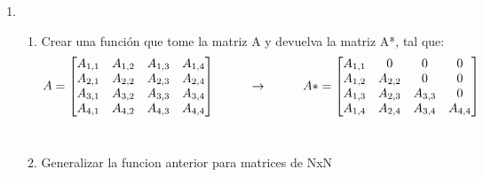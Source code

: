 \documentclass[a4paper, 11pt]{article}
\begin{document}
\begin{enumerate}[font=\large\bfseries]
\item
\begin{enumerate}
    \item Crear una función que tome la matriz A y devuelva la matriz A*, tal que:
    \[
      A=\begin{bmatrix}
        A_{1,1} & A_{1,2} & A_{1,3} & A_{1,4} \\
        A_{2,1} & A_{2,2} & A_{2,3} & A_{2,4} \\
        A_{3,1} & A_{3,2} & A_{3,3} & A_{3,4} \\
        A_{4,1} & A_{4,2} & A_{4,3} & A_{4,4}
     \end{bmatrix}
    \hspace{1cm} \LARGE\rightarrow\normalsize
    \hspace{1cm} A*=\begin{bmatrix}
        A_{1,1} & 0 & 0 & 0 \\
        A_{1,2} & A_{2,2} & 0 & 0 \\
        A_{1,3} & A_{2,3} & A_{3,3} & 0 \\
        A_{1,4} & A_{2,4} & A_{3,4} & A_{4,4}
     \end{bmatrix}
     \]\\
      
    \item Generalizar la funcion anterior para matrices de NxN 
\end{enumerate}
    
\end{enumerate}
\end{document}
